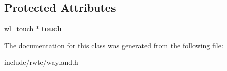 \subsection*{Protected Attributes}
\begin{DoxyCompactItemize}
\item 
\mbox{\label{classwayland_1_1Touch_a74709522fae867c7d22bfdb29b99f416}} 
wl\+\_\+touch $\ast$ {\bfseries touch}
\end{DoxyCompactItemize}


The documentation for this class was generated from the following file\+:\begin{DoxyCompactItemize}
\item 
include/rwte/wayland.\+h\end{DoxyCompactItemize}
